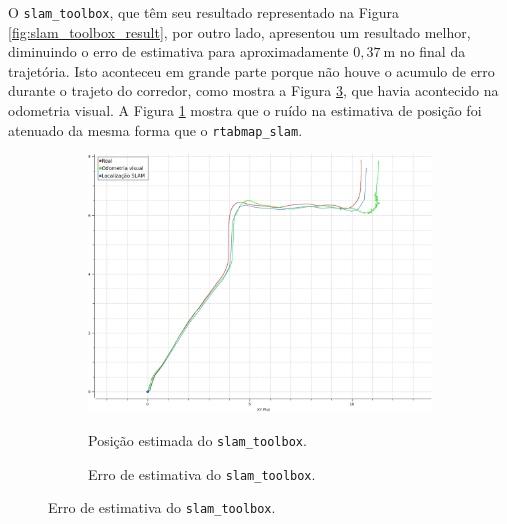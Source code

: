\documentclass[repeatfields,xlists,xpacks,oneside,yearsonly]{ufrgscca}
\begin{document}
O \texttt{slam\_toolbox}, que têm seu resultado representado na
Figura \ref{fig:slam_toolbox_result}, por outro lado, apresentou um
resultado melhor, diminuindo o erro de estimativa para
aproximadamente $0,37~\si{\meter}$ no final da trajetória. Isto
aconteceu em grande parte porque não houve o acumulo de erro durante
o trajeto do corredor, como mostra a Figura
\ref{fig:localization_slam_toolbox_error}, que havia acontecido na
odometria visual. A Figura \ref{fig:localization_slam_toolbox} mostra
que o ruído na estimativa de posição foi atenuado da mesma forma que
o \texttt{rtabmap\_slam}.

\begin{figure}[h]
    \caption{Resultado do pacote \texttt{slam\_toolbox}.}
    \label{fig:slam_toolbox_result}
    \begin{subfigure}{0.5\linewidth}
        {
            \centering
            \caption{Posição estimada do \texttt{slam\_toolbox}.}
            \label{fig:localization_slam_toolbox}
            \includegraphics[width=0.98\linewidth]{localization-slam-toolbox.png}\\
        }
    \end{subfigure}
    \begin{subfigure}{0.5\linewidth}
        {
            \centering
            \caption{Erro de estimativa do \texttt{slam\_toolbox}.}
            \label{fig:localization_slam_toolbox_error}
}
\end{subfigure}
\end{figure}
\end{document}
